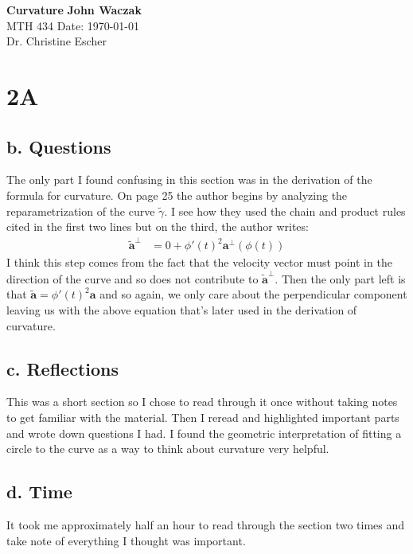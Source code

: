 \documentclass[a4paper, 11pt]{article}
\begin{document}
\noindent
\large\textbf{Curvature} \hfill \textbf{John Waczak} \\
\normalsize MTH 434 \hfill  Date: \today \\
Dr. Christine Escher \\

\section*{2A}
	\subsection*{b. Questions}
	The only part I found confusing in this section was in the derivation of the formula for curvature. On page 25 the author begins by analyzing the reparametrization of the curve $\tilde{\gamma}$. I see how they used the chain and product rules cited in the first two lines but on the third, the author writes:
		\begin{align*}
			\tilde{\mathbf{a}}^{\perp} &= 0 + \phi'(t)^2\mathbf{a}^{\perp}(\phi(t))
		\end{align*}
	I think this step comes from the fact that the velocity vector must point in the direction of the curve and so does not contribute to $\tilde{\mathbf{a}}^{\perp}$. Then the only part left is that $\tilde{\mathbf{a}}=\phi'(t)^2\mathbf{a}$ and so again, we only care about the perpendicular component leaving us with the above equation that's later used in the derivation of curvature. 
	\subsection*{c. Reflections}
	This was a short section so I chose to read through it once without taking notes to get familiar with the material. Then I reread and highlighted important parts and wrote down questions I had. I found the geometric interpretation of fitting a circle to the curve as a way to think about curvature very helpful. 
	
	
	\subsection*{d. Time}
	It took me approximately half an hour to read through the section two times and take note of everything I thought was important.
\end{document}
